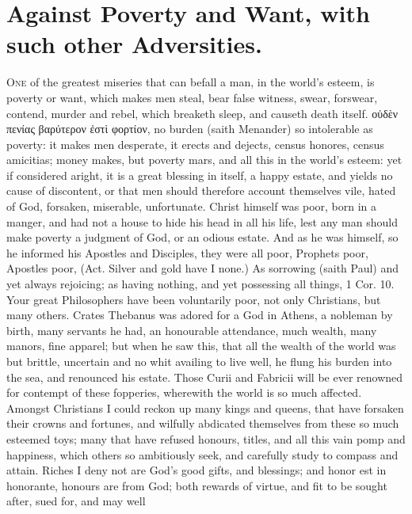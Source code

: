 {%

\section{Against Poverty and Want, with such other Adversities.}

\lettrine{O}{ne} of the greatest miseries that can befall a man, in the world's
esteem, is poverty or want, which makes men steal, bear false witness,
swear, forswear, contend, murder and rebel, which breaketh sleep, and
causeth death itself. \textgreek{οὐδὲν πενίας βαρύτερον ἐστὶ φορτίον}, no burden
(saith Menander) so intolerable as poverty: it makes men
desperate, it erects and dejects, census honores, census amicitias;
money makes, but poverty mars, \etc{} and all this in the world's esteem:
yet if considered aright, it is a great blessing in itself, a happy
estate, and yields no cause of discontent, or that men should therefore
account themselves vile, hated of God, forsaken, miserable,
unfortunate. Christ himself was poor, born in a manger, and had not a
house to hide his head in all his life, lest any man should make
poverty a judgment of God, or an odious estate. And as he was himself,
so he informed his Apostles and Disciples, they were all poor, Prophets
poor, Apostles poor, (Act.  Silver and gold have I none.) As
sorrowing (saith Paul) and yet always rejoicing; as having nothing, and
yet possessing all things, 1 Cor.  10. Your great Philosophers have
been voluntarily poor, not only Christians, but many others. Crates
Thebanus was adored for a God in Athens, a nobleman by birth,
many servants he had, an honourable attendance, much wealth, many
manors, fine apparel; but when he saw this, that all the wealth of the
world was but brittle, uncertain and no whit availing to live well, he
flung his burden into the sea, and renounced his estate. Those Curii
and Fabricii will be ever renowned for contempt of these fopperies,
wherewith the world is so much affected. Amongst Christians I could
reckon up many kings and queens, that have forsaken their crowns and
fortunes, and wilfully abdicated themselves from these so much esteemed
toys; many that have refused honours, titles, and all this vain
pomp and happiness, which others so ambitiously seek, and carefully
study to compass and attain. Riches I deny not are God's good gifts,
and blessings; and honor est in honorante, honours are from God; both
rewards of virtue, and fit to be sought after, sued for, and may well
}
